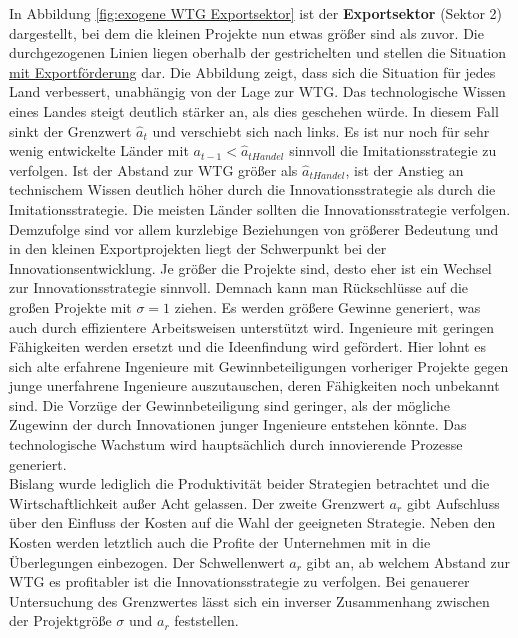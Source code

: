%	
In Abbildung \ref{fig:exogene WTG Exportsektor} ist der \textbf{Exportsektor} (Sektor 2) dargestellt, bei dem die kleinen Projekte nun etwas größer sind als zuvor. Die durchgezogenen Linien liegen oberhalb der gestrichelten und stellen die Situation \underline{mit Exportförderung} dar. Die Abbildung zeigt, dass sich die Situation für jedes Land verbessert, unabhängig von der Lage zur WTG. Das technologische Wissen eines Landes steigt deutlich stärker an, als dies  geschehen würde. In diesem Fall sinkt der Grenzwert $\hat{a}_t$ und verschiebt sich nach links. Es ist nur noch für sehr wenig entwickelte Länder mit $a_{t-1}<\hat{a}_{tHandel}$ sinnvoll die \textcolor[rgb]{0,0.32,0}{Imitationsstrategie} zu verfolgen. Ist der Abstand zur WTG größer als $\hat{a}_{tHandel}$, ist der Anstieg an technischem Wissen deutlich höher durch die \textcolor[rgb]{0.74,0.97,0.22}{Innovationsstrategie} als durch die \textcolor[rgb]{0,0.32,0}{Imitationsstrategie}. Die meisten Länder sollten die \textcolor[rgb]{0.74,0.97,0.22}{Innovationsstrategie} verfolgen.\\
%
Demzufolge sind vor allem kurzlebige Beziehungen von größerer Bedeutung und in den kleinen Exportprojekten liegt der Schwerpunkt bei der Innovationsentwicklung. Je größer die Projekte sind, desto eher ist ein Wechsel zur Innovationsstrategie sinnvoll. Demnach kann man Rückschlüsse auf die großen Projekte mit $\sigma=1$ ziehen. Es werden größere Gewinne generiert, was auch durch effizientere Arbeitsweisen unterstützt wird. Ingenieure mit geringen Fähigkeiten werden ersetzt und die Ideenfindung wird gefördert.
Hier lohnt es sich alte erfahrene Ingenieure mit Gewinnbeteiligungen vorheriger Projekte gegen junge unerfahrene Ingenieure auszutauschen, deren Fähigkeiten noch unbekannt sind. Die Vorzüge der Gewinnbeteiligung sind geringer, als der mögliche Zugewinn der durch Innovationen junger Ingenieure entstehen könnte. Das technologische Wachstum wird hauptsächlich durch innovierende Prozesse generiert.\\ 
%
Bislang wurde lediglich die Produktivität beider Strategien betrachtet und die Wirtschaftlichkeit außer Acht gelassen. Der zweite Grenzwert $a_r$ gibt Aufschluss über den Einfluss der Kosten auf die Wahl der geeigneten Strategie. Neben den Kosten werden letztlich auch die Profite der Unternehmen mit in die Überlegungen einbezogen. Der Schwellenwert $a_r$ gibt an, ab welchem Abstand zur WTG es profitabler ist die Innovationsstrategie zu verfolgen. Bei genauerer Untersuchung des Grenzwertes lässt sich ein inverser Zusammenhang zwischen der Projektgröße $\sigma$ und $a_r$ feststellen.\\
